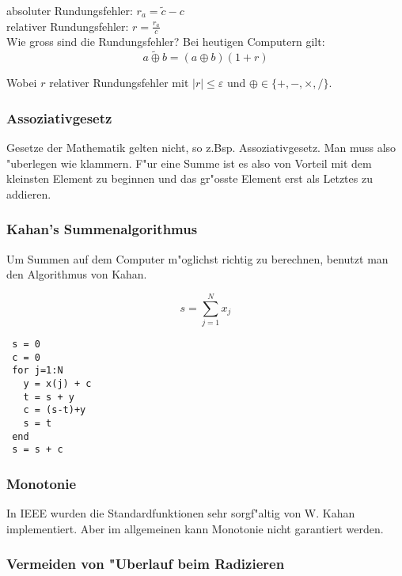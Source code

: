 \documentclass[german, 10pt, a4paper, twocolumn]{scrartcl}
\theoremstyle{definition}
\begin{document}
absoluter Rundungsfehler: $r_a = \tilde{c} - c$\\
relativer Rundungsfehler: $r = \frac{r_a}{c}$\\

Wie gross sind die Rundungsfehler? Bei heutigen Computern gilt:
\begin{displaymath}
	a \tilde{\oplus} b = (a \oplus b) (1+r)
\end{displaymath}

Wobei $r$ relativer Rundungsfehler mit $|r|\leq \varepsilon$ und $\oplus \in \{+, - ,\times, /\}$.

\subsubsection{Assoziativgesetz}

Gesetze der Mathematik gelten nicht, so z.Bsp. Assoziativgesetz. Man muss also "uberlegen wie klammern. F"ur eine Summe ist es also von Vorteil mit dem kleinsten Element zu beginnen und das gr"osste Element erst als Letztes zu addieren.

\subsubsection{Kahan's Summenalgorithmus}

Um Summen auf dem Computer m"oglichst richtig zu berechnen, benutzt man den Algorithmus von Kahan.

\begin{displaymath}
	s = \sum^N_{j=1} x_j
\end{displaymath}

\small
\begin{verbatim}
 s = 0
 c = 0
 for j=1:N
   y = x(j) + c
   t = s + y
   c = (s-t)+y
   s = t
 end
 s = s + c
\end{verbatim}
\normalsize

\subsubsection{Monotonie}

In IEEE wurden die Standardfunktionen sehr sorgf"altig von W. Kahan implementiert. Aber im allgemeinen kann Monotonie nicht garantiert werden.

\subsubsection{Vermeiden von "Uberlauf beim Radizieren}
\end{document}

